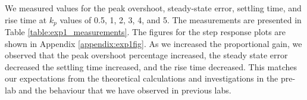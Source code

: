 \documentclass[12pt]{article}
\begin{document}
We measured values for the peak overshoot, steady-state error, settling time, and rise time at $k_p$ values of 0.5, 1, 2, 3, 4, and 5. The measurements are presented in Table \ref{table:exp1_measurements}. The figures for the step response plots are shown in Appendix \ref{appendix:exp1fig}. As we increased the proportional gain, we observed that the peak overshoot percentage increased, the steady state error decreased the settling time increased, and the rise time decreased. This matches our expectations from the theoretical calculations and investigations in the pre-lab and the behaviour that we have observed in previous labs. %


\end{document}
